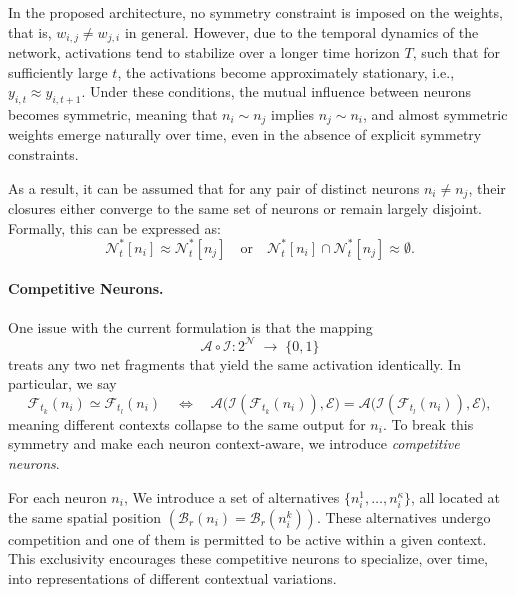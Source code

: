 \documentclass[12pt]{article}
\begin{document}
In the proposed architecture, no symmetry constraint is imposed on the weights, that is, $w_{i,j} \neq w_{j,i}$ in general.
However, due to the temporal dynamics of the network, activations tend to stabilize over a longer time horizon $T$, such that for sufficiently large $t$, the activations become approximately stationary, i.e., $y_{i, t} \approx y_{i, t+1}$.
Under these conditions, the mutual influence between neurons becomes symmetric, meaning that $n_i \sim n_j$ implies $n_j \sim n_i$, and almost symmetric weights emerge naturally over time, even in the absence of explicit symmetry constraints.


As a result, it can be assumed that for any pair of distinct neurons $n_i \neq n_j$, their closures either converge to the same set of neurons or remain largely disjoint.
Formally, this can be expressed as:
%
\begin{equation}
    \mathcal{N}_t^{*}[n_i]  \approx \mathcal{N}_t^{*}[n_j] \quad \text{or} \quad  \mathcal{N}_t^{*}[n_i]  \cap  \mathcal{N}_t^{*}[n_j] \approx \emptyset.
\end{equation}


\paragraph{Competitive Neurons.}
One issue with the current formulation is that the mapping
%
\begin{equation}
  \mathcal{A}\circ\mathcal{I}:2^{\mathcal{N}}\;\longrightarrow\;\{0,1\}
\end{equation}
%
treats any two net fragments that yield the same activation identically.  In particular, we say
%
\begin{equation}
  \mathcal{F}_{t_k}(n_i)\simeq\mathcal{F}_{t_l}(n_i)
  \quad\Longleftrightarrow\quad
  \mathcal{A}\bigl(\mathcal{I}(\mathcal{F}_{t_k}(n_i)),\mathcal{E}\bigr)
  =\mathcal{A}\bigl(\mathcal{I}(\mathcal{F}_{t_l}(n_i)),\mathcal{E}\bigr),
\end{equation}
%
meaning different contexts collapse to the same output for $n_i$. To break this symmetry and make each neuron context-aware, we introduce \emph{competitive neurons}.

For each neuron $n_i$, We introduce a set of alternatives $\{n_i^1,\dots,n_i^\kappa\}$, all located at the same spatial position $\left ( \mathcal{B}_r(n_i)=\mathcal{B}_r(n_i^k) \right )$.
These alternatives undergo competition and one of them is permitted to be active within a given context. This exclusivity encourages these competitive neurons to specialize, over time, into representations of different contextual variations.
\end{document}
